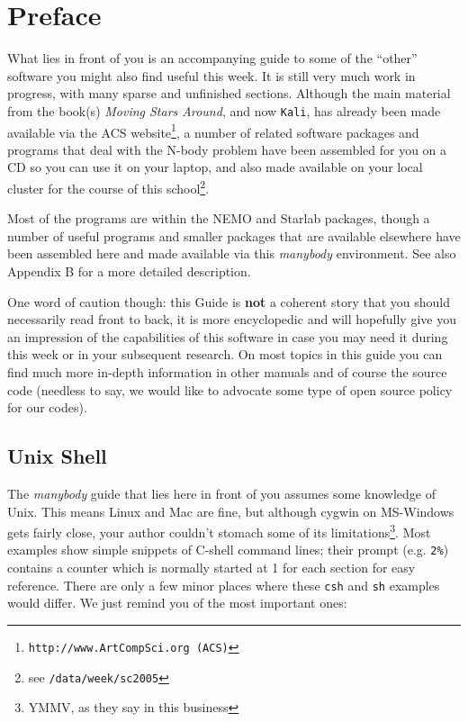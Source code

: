 \chapter*{Preface}

What lies in front of you is an accompanying guide to some of 
the ``other'' software you might also find useful this week.
It is still very much work in progress, with many sparse and
unfinished sections.
Although
the main material from the book(s) {\it Moving Stars Around}, and now
{\tt Kali},
has already been made available via the ACS
website\footnote{\tt http://www.ArtCompSci.org (ACS)},
a number of related
software packages and programs that deal with the N-body problem have been
assembled for you on a CD so you can use it on your laptop,
and also made available on your local 
cluster for the course of 
this school\footnote{see {\tt /data/week/sc2005}}.

Most of the programs are within the NEMO  and Starlab packages, 
though a number of useful programs and smaller packages
that are available elsewhere have been assembled here
and made available via this {\it manybody} environment.
See also Appendix B for a more detailed description.

One word of caution though: this Guide is {\bf not} a coherent
story that you should necessarily read front to back, it is more encyclopedic
and will hopefully give you an impression of the capabilities
of this software in case you may need it during this week or in
your subsequent research. On most topics in this guide you can find
much more in-depth information in other manuals and of course 
the source code (needless to say, we would like to advocate some
type of open source policy for our codes).

%

\section*{Unix Shell}

The {\it manybody} guide that lies here in front of you assumes some knowledge
of Unix. This means Linux and Mac are fine, but although cygwin on MS-Windows
gets fairly close, your author couldn't stomach some of 
its limitations\footnote{YMMV, as they say in this business}.
Most examples show simple snippets
of C-shell command lines; their prompt (e.g. \verb+2%+) 
contains a counter which is normally started at 1 for each section
for easy reference.
There are only a few minor places where these {\tt csh} and 
{\tt sh} examples would differ. We just remind you of
the most important ones:

